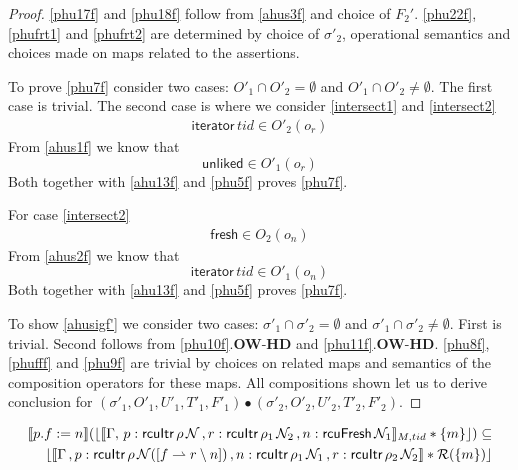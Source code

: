 \begin{proof}
\ref{phu17f} and \ref{phu18f} follow from \ref{ahus3f} and choice of $F_2'$. \ref{phu22f}, \ref{phufrt1} and \ref{phufrt2} are determined by  choice of $\sigma'_2$, operational semantics and choices made on maps related to the assertions.

To prove \ref{phu7f} consider two cases: $O'_1 \cap O'_2 = \emptyset$ and $O'_1 \cap O'_2 \neq \emptyset$. The first case is trivial. The second case is where we consider \ref{intersect1} and \ref{intersect2}
\begin{gather}\label{intersect1}
\textsf{iterator}\,tid \in O'_2(o_r)
\end{gather}
From \ref{ahus1f} we know that
\[\textsf{unliked} \in O'_1(o_r)\]
Both together with \ref{ahu13f} and \ref{phu5f} proves \ref{phu7f}.

For case \ref{intersect2}
\begin{gather}\label{intersect2}
\textsf{fresh} \in O_2(o_n)
\end{gather}
From \ref{ahus2f} we know that
\[\textsf{iterator}\, tid \in O'_1(o_n)\]
Both together with \ref{ahu13f} and \ref{phu5f} proves \ref{phu7f}.

To show \ref{ahusigf'} we consider two cases: $\sigma'_1 \cap \sigma'_2 = \emptyset$ and $\sigma'_1 \cap \sigma'_2 \neq \emptyset$. First is trivial. Second follows from \ref{phu10f}.\textbf{OW}-\textbf{HD} and \ref{phu11f}.\textbf{OW}-\textbf{HD}. \ref{phu8f}, \ref{phufff} and \ref{phu9f} are trivial by choices on related maps and semantics of the composition operators for these maps. All compositions shown  let us to derive conclusion for $(\sigma'_1, O'_1, U'_1, T'_1,F'_1) \bullet (\sigma'_2, O'_2, U'_2, T'_2,F'_2) $.
 \end{proof}
 \begin{lemma}
   \label{lemma:linkflk}
   \begin{align*}
  \llbracket p.f := n \rrbracket (\lfloor \llbracket \Gamma,\,
 p:\textsf{rcuItr}\, \rho \, \mathcal{N} \, ,
  r:\textsf{rcuItr}\, \rho_1 \, \mathcal{N}_2 \, , n:\textsf{rcuFresh} \, \mathcal{N}_1 \rrbracket_{M,tid} * \{m\}\rfloor)  \subseteq \\
  \lfloor \llbracket \Gamma \,,p:\textsf{rcuItr}\, \rho \, \mathcal{N}([f \rightharpoonup r \setminus  n]) \, , n:\textsf{rcuItr}\, \rho_1 \, \mathcal{N}_1 \, ,r:\textsf{rcuItr}\,\rho_2\,\mathcal{N}_2 \rrbracket  * \mathcal{R}(\{m\})\rfloor
\end{align*}
 \end{lemma}
